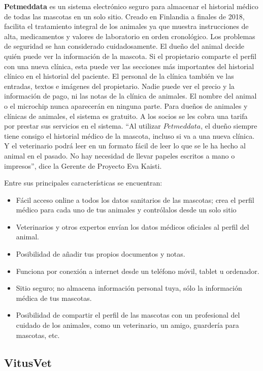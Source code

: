 \textbf{Petmeddata}  es un sistema electrónico seguro para almacenar el historial médico de todas las mascotas en un solo sitio. Creado en Finlandia a finales de 2018, facilita el tratamiento integral de los animales ya que muestra instrucciones de alta, medicamentos y valores de laboratorio en orden cronológico. Los problemas de seguridad se han considerado cuidadosamente. El dueño del animal decide quién puede ver la información de la mascota. Si el propietario comparte el perfil con una nueva clínica, esta puede ver las secciones más importantes del historial clínico en el historial del paciente. El personal de la clínica también ve las entradas, textos e imágenes del propietario. Nadie puede ver el precio y la información de pago, ni las notas de la clínica de animales. El nombre del animal o el microchip nunca aparecerán en ninguna parte. Para dueños de animales y clínicas de animales, el sistema es gratuito. A los socios se les cobra una tarifa por prestar sus servicios en el sistema.
“Al utilizar $Petmeddata$, el dueño siempre tiene consigo el historial médico de la mascota, incluso si va a una nueva clínica. Y el veterinario podrá leer en un formato fácil de leer lo que se le ha hecho al animal en el pasado. No hay necesidad de llevar papeles escritos a mano o impresos”, dice la Gerente de Proyecto Eva Kaisti.

Entre sus principales características se encuentran:
\begin{itemize}


\item	Fácil acceso online a todos los datos sanitarios de las mascotas; crea el perfil médico para cada uno de tus animales y contrólalos desde un solo sitio
\item	Veterinarios y otros expertos envían los datos médicos oficiales al perfil del animal.
\item	Posibilidad de añadir tus propios documentos y notas.
\item	Funciona por conexión a internet desde un teléfono móvil, tablet u ordenador.
\item	Sitio seguro; no almacena información personal tuya, sólo la información médica de tus mascotas.
\item	Posibilidad de compartir el perfil de las mascotas con un profesional del cuidado de los animales, como un veterinario, un amigo, guardería para mascotas, etc.
\end{itemize}


\subsection{VitusVet}\label{chapter:introduction}

